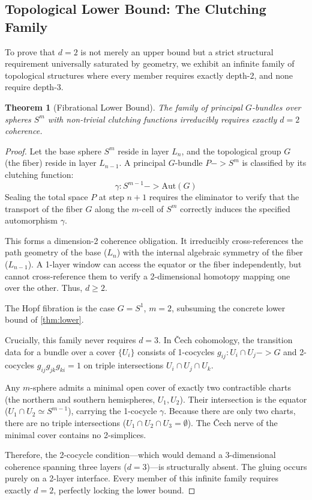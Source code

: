 \documentclass[11pt,a4paper]{article}
\def\to{->}%
\theoremstyle{plain}
\newtheorem{theorem}{Theorem}[section]
\theoremstyle{definition}
\theoremstyle{remark}
\begin{document}
\subsection{Topological Lower Bound: The Clutching Family}
\label{sec:clutching-family}

To prove that $d = 2$ is not merely an upper bound but a strict structural requirement universally saturated by geometry, we exhibit an infinite family of topological structures where every member requires exactly depth-2, and none require depth-3.

\begin{theorem}[Fibrational Lower Bound]
\label{thm:clutching-bound}
The family of principal $G$-bundles over spheres $S^m$ with non-trivial clutching functions irreducibly requires exactly $d = 2$ coherence.
\end{theorem}

\begin{proof}
Let the base sphere $S^m$ reside in layer $L_n$, and the topological group $G$ (the fiber) reside in layer $L_{n-1}$. A principal $G$-bundle $P \to S^m$ is classified by its clutching function:
\begin{equation}
    \gamma : S^{m-1} \to \mathrm{Aut}(G)
\end{equation}
Sealing the total space $P$ at step $n+1$ requires the eliminator to verify that the transport of the fiber $G$ along the $m$-cell of $S^m$ correctly induces the specified automorphism $\gamma$.

This forms a dimension-2 coherence obligation. It irreducibly cross-references the path geometry of the base ($L_n$) with the internal algebraic symmetry of the fiber ($L_{n-1}$). A 1-layer window can access the equator or the fiber independently, but cannot cross-reference them to verify a 2-dimensional homotopy mapping one over the other. Thus, $d \ge 2$.

The Hopf fibration is the case $G = S^1$, $m = 2$, subsuming the concrete lower bound of \cref{thm:lower}.

Crucially, this family never requires $d = 3$. In \v{C}ech cohomology, the transition data for a bundle over a cover $\{U_i\}$ consists of 1-cocycles $g_{ij} : U_i \cap U_j \to G$ and 2-cocycles $g_{ij}g_{jk}g_{ki} = 1$ on triple intersections $U_i \cap U_j \cap U_k$.

Any $m$-sphere admits a minimal open cover of exactly two contractible charts (the northern and southern hemispheres, $U_1, U_2$). Their intersection is the equator ($U_1 \cap U_2 \simeq S^{m-1}$), carrying the 1-cocycle $\gamma$. Because there are only two charts, there are no triple intersections ($U_1 \cap U_2 \cap U_3 = \emptyset$). The \v{C}ech nerve of the minimal cover contains no 2-simplices.

Therefore, the 2-cocycle condition---which would demand a 3-dimensional coherence spanning three layers ($d=3$)---is structurally absent. The gluing occurs purely on a 2-layer interface. Every member of this infinite family requires exactly $d = 2$, perfectly locking the lower bound.
\end{proof}
\end{document}
